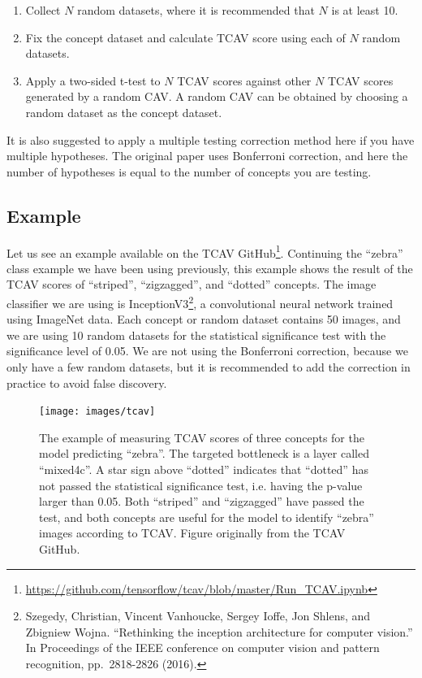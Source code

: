\documentclass[
  11pt,
]{scrbook}
\providecommand{\tightlist}{%
  \setlength{\itemsep}{0pt}\setlength{\parskip}{0pt}}
\renewcommand{\href}[2]{#2\footnote{\url{#1}}}
\begin{document}
\begin{enumerate}
\def\labelenumi{\arabic{enumi}.}
\tightlist
\item
  Collect \(N\) random datasets, where it is recommended that \(N\) is at least 10.
\item
  Fix the concept dataset and calculate TCAV score using each of \(N\) random datasets.
\item
  Apply a two-sided t-test to \(N\) TCAV scores against other \(N\) TCAV scores generated by a random CAV.
  A random CAV can be obtained by choosing a random dataset as the concept dataset.
\end{enumerate}

It is also suggested to apply a multiple testing correction method here if you have multiple hypotheses.
The original paper uses Bonferroni correction, and here the number of hypotheses is equal to the number of concepts you are testing.

\hypertarget{example-9}{%
\subsection{Example}\label{example-9}}

Let us see an example available on the TCAV \href{https://github.com/tensorflow/tcav/blob/master/Run_TCAV.ipynb}{GitHub}.
Continuing the ``zebra'' class example we have been using previously, this example shows the result of the TCAV scores of ``striped'', ``zigzagged'', and ``dotted'' concepts.
The image classifier we are using is InceptionV3\footnote{Szegedy, Christian, Vincent Vanhoucke, Sergey Ioffe, Jon Shlens, and Zbigniew Wojna. ``Rethinking the inception architecture for computer vision.'' In Proceedings of the IEEE conference on computer vision and pattern recognition, pp.~2818-2826 (2016).}, a convolutional neural network trained using ImageNet data.
Each concept or random dataset contains 50 images, and we are using 10 random datasets for the statistical significance test with the significance level of 0.05.
We are not using the Bonferroni correction, because we only have a few random datasets, but it is recommended to add the correction in practice to avoid false discovery.

\begin{figure}

{\centering \texttt{[image: images/tcav]} 

}

\caption{The example of measuring TCAV scores of three concepts for the model predicting “zebra”. The targeted bottleneck is a layer called “mixed4c”. A star sign above “dotted” indicates that “dotted” has not passed the statistical significance test, i.e. having the p-value larger than 0.05. Both “striped” and “zigzagged” have passed the test, and both concepts are useful for the model to identify “zebra” images according to TCAV. Figure originally from the TCAV GitHub.}\label{fig:unnamed-chunk-61}
\end{figure}
\end{document}
